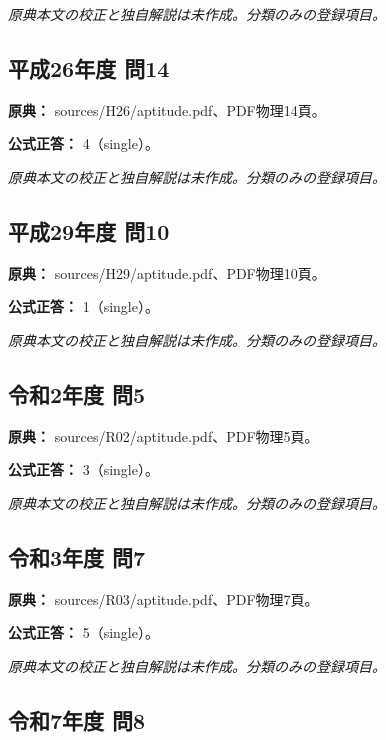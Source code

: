 \par\textit{原典本文の校正と独自解説は未作成。分類のみの登録項目。}

\subsection{平成26年度 問14}
\label{q:h26-reg-apt-14}

\noindent\textbf{原典：} sources/H26/aptitude.pdf、PDF物理14頁。

\textbf{公式正答：} 4（single）。

\par\textit{原典本文の校正と独自解説は未作成。分類のみの登録項目。}

\subsection{平成29年度 問10}
\label{q:h29-reg-apt-10}

\noindent\textbf{原典：} sources/H29/aptitude.pdf、PDF物理10頁。

\textbf{公式正答：} 1（single）。

\par\textit{原典本文の校正と独自解説は未作成。分類のみの登録項目。}

\subsection{令和2年度 問5}
\label{q:r02-reg-apt-05}

\noindent\textbf{原典：} sources/R02/aptitude.pdf、PDF物理5頁。

\textbf{公式正答：} 3（single）。

\par\textit{原典本文の校正と独自解説は未作成。分類のみの登録項目。}

\subsection{令和3年度 問7}
\label{q:r03-reg-apt-07}

\noindent\textbf{原典：} sources/R03/aptitude.pdf、PDF物理7頁。

\textbf{公式正答：} 5（single）。

\par\textit{原典本文の校正と独自解説は未作成。分類のみの登録項目。}

\subsection{令和7年度 問8}
\label{q:r07-reg-apt-08}

